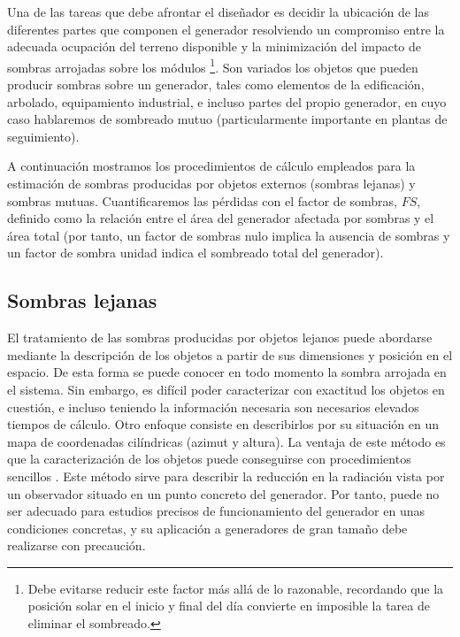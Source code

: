 Una de las tareas que debe afrontar el diseñador es decidir la ubicación
de las diferentes partes que componen el generador resolviendo un
compromiso entre la adecuada ocupación del terreno disponible y la
minimización del impacto de sombras arrojadas sobre los módulos%
\footnote{Debe evitarse reducir este factor más allá de lo razonable, recordando
que la posición solar en el inicio y final del día convierte en imposible
la tarea de eliminar el sombreado.%
}. Son variados los objetos que pueden producir sombras sobre un generador,
tales como elementos de la edificación, arbolado, equipamiento industrial,
e incluso partes del propio generador, en cuyo caso hablaremos de
sombreado mutuo (particularmente importante en plantas de seguimiento).

A continuación mostramos los procedimientos de cálculo empleados para
la estimación de sombras producidas por objetos externos (sombras
lejanas) y sombras mutuas. Cuantificaremos las pérdidas con el factor
de sombras, $FS$,
definido como la relación entre el área del generador afectada por
sombras y el área total (por tanto, un factor de sombras nulo implica
la ausencia de sombras y un factor de sombra unidad indica el sombreado
total del generador).


\subsection{Sombras lejanas\label{sub:Sombras-lejanas}}

El tratamiento de las sombras producidas por objetos lejanos puede
abordarse mediante la descripción de los objetos a partir de sus dimensiones
y posición en el espacio. De esta forma se puede conocer en todo momento
la sombra arrojada en el sistema. Sin embargo, es difícil poder caracterizar
con exactitud los objetos en cuestión, e incluso teniendo la información
necesaria son necesarios elevados tiempos de cálculo. Otro enfoque
consiste en describirlos por su situación en un mapa de coordenadas
cilíndricas (azimut y altura). La ventaja de este método es que la
caracterización de los objetos puede conseguirse con procedimientos
sencillos \citep{Caamano1998,Quaschning.Hanitsch1998}. Este método
sirve para describir la reducción en la radiación vista por un observador
situado en un punto concreto del generador. Por tanto, puede no ser
adecuado para estudios precisos de funcionamiento del generador en
unas condiciones concretas, y su aplicación a generadores de gran
tamaño debe realizarse con precaución. 

